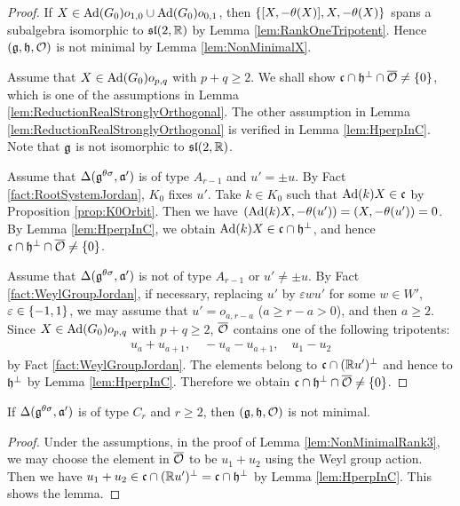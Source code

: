 \begin{proof}
	If $X \in \mathrm{Ad}(G_0)o_{1,0}\cup \mathrm{Ad}(G_0)o_{0,1}$, then $\left\{[X, -\theta(X)], X, -\theta(X) \right\}$ spans a subalgebra isomorphic to $\mathfrak{sl}(2,\mathbb{R})$ by Lemma \ref{lem:RankOneTripotent}.
	Hence $(\mathfrak{g}, \mathfrak{h}, \mathcal{O})$ is not minimal by Lemma \ref{lem:NonMinimalX}.
	
	Assume that $X \in \mathrm{Ad}(G_0)o_{p, q}$ with $p + q \geq 2$.
	We shall show $\mathfrak{c}\cap \mathfrak{h}^\perp \cap \overline{\mathcal{O}} \neq \left\{0 \right\}$, which is one of the assumptions in Lemma \ref{lem:ReductionRealStronglyOrthogonal}.
	The other assumption in Lemma \ref{lem:ReductionRealStronglyOrthogonal} is verified in Lemma \ref{lem:HperpInC}.
	Note that $\mathfrak{g}$ is not isomorphic to $\mathfrak{sl}(2,\mathbb{R})$.

	Assume that $\Delta(\mathfrak{g}^{\theta\sigma}, \mathfrak{a'})$ is of type $A_{r-1}$ and $u' = \pm u$.
	By Fact \ref{fact:RootSystemJordan}, $K_0$ fixes $u'$.
	Take $k \in K_0$ such that $\mathrm{Ad}(k)X \in \mathfrak{c}$ by Proposition \ref{prop:K0Orbit}.
	Then we have $(\mathrm{Ad}(k)X, -\theta(u')) = (X, -\theta(u')) = 0$.
	By Lemma \ref{lem:HperpInC}, we obtain $\mathrm{Ad}(k)X \in \mathfrak{c} \cap \mathfrak{h}^\perp$, and hence $\mathfrak{c}\cap \mathfrak{h}^\perp \cap \overline{\mathcal{O}} \neq \left\{0 \right\}$.

	Assume that $\Delta(\mathfrak{g}^{\theta\sigma}, \mathfrak{a'})$ is not of type $A_{r-1}$ or $u' \neq \pm u$.
	By Fact \ref{fact:WeylGroupJordan}, if necessary, replacing $u'$ by $\varepsilon wu'$ for some $w \in W'$, $\varepsilon \in \left\{-1, 1 \right\}$, we may assume that $u'=o_{a,r-a}$ ($a\geq r-a > 0$), and then $a \geq 2$.
	Since $X \in \mathrm{Ad}(G_0)o_{p, q}$ with $p + q \geq 2$, $\overline{\mathcal{O}}$ contains one of the following tripotents:
	\begin{align*}
		u_a+u_{a+1}, \quad -u_a-u_{a+1}, \quad u_1-u_2
	\end{align*}
	by Fact \ref{fact:WeylGroupJordan}.
	The elements belong to $\mathfrak{c} \cap (\mathbb{R} u')^\perp$ and hence to $\mathfrak{h}^\perp$ by Lemma \ref{lem:HperpInC}.
	Therefore we obtain $\mathfrak{c}\cap \mathfrak{h}^\perp \cap \overline{\mathcal{O}} \neq \left\{0 \right\}$.
\end{proof}

\begin{lemma}
	If $\Delta(\mathfrak{g}^{\theta\sigma}, \mathfrak{a'})$ is of type $C_{r}$ and $r\geq 2$, then $(\mathfrak{g}, \mathfrak{h}, \mathcal{O})$ is not minimal.
\end{lemma}

\begin{proof}
	Under the assumptions, in the proof of Lemma \ref{lem:NonMinimalRank3}, we may choose the element in $\overline{\mathcal{O}}$ to be $u_1 + u_2$ using the Weyl group action.
	Then we have $u_1 + u_2 \in \mathfrak{c} \cap (\mathbb{R} u')^\perp = \mathfrak{c} \cap \mathfrak{h}^\perp$ by Lemma \ref{lem:HperpInC}.
	This shows the lemma.
\end{proof}

